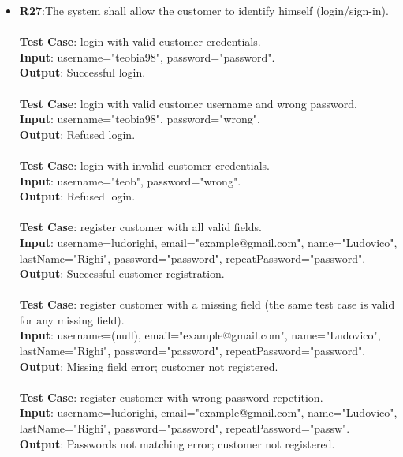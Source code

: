 \begin{itemize}
	\item \textbf{R27}:The system shall allow the customer to identify himself (login/sign-in). \\ \\ \textbf{Test Case}: login with valid customer credentials.  \\  \textbf{Input}: username="teobia98", password="password".\\ 		\textbf{Output}: Successful login. \\
\\ \textbf{Test Case}: login with valid customer username and wrong password.  \\  \textbf{Input}: username="teobia98", password="wrong".\\ 		\textbf{Output}: Refused login. \\
\\ \textbf{Test Case}: login with invalid customer credentials.  \\  \textbf{Input}: username="teob", password="wrong".\\ 		\textbf{Output}: Refused login.
\\ \\ \textbf{Test Case}: register customer with all valid fields. \\ \textbf{Input}: username=ludorighi, email="example@gmail.com", name="Ludovico", lastName="Righi", password="password", repeatPassword="password".\\ 		\textbf{Output}: Successful customer registration. \\
\\ \textbf{Test Case}: register customer with a missing field (the same test case is valid for any missing field).  \\  \textbf{Input}: username=(null), email="example@gmail.com", name="Ludovico", lastName="Righi", password="password", repeatPassword="password".\\ 		\textbf{Output}: Missing field error; customer not registered. \\
\\ \textbf{Test Case}: register customer with wrong password repetition.  \\  \textbf{Input}: username=ludorighi, email="example@gmail.com", name="Ludovico", lastName="Righi", password="password", repeatPassword="passw".\\ 		\textbf{Output}: Passwords not matching error; customer not registered. \\	



\end{itemize}
